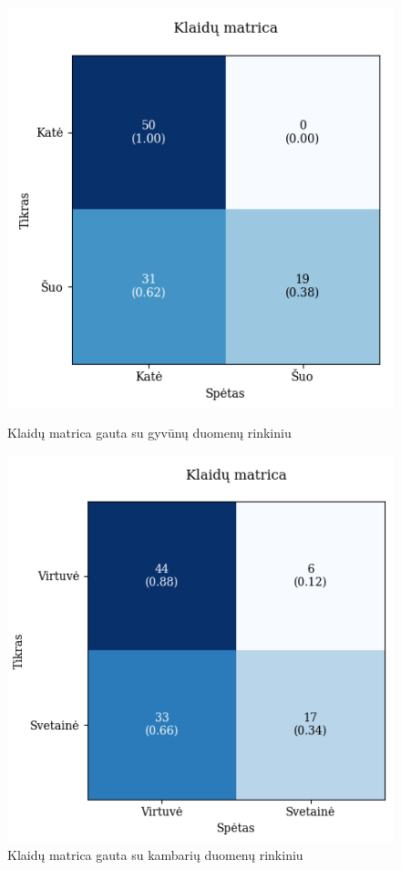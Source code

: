 \documentclass{VUMIFPSbakalaurinis}
\begin{document}
\begin{figure}[!htbp]
    \centering
    \begin{minipage}[b]{0.48\textwidth}
      \includegraphics[width=\textwidth]{img/GrapthsNEW/Small/animal/20/KM_DC_S_20.png}
      \caption{Klaidų matrica gauta su gyvūnų duomenų rinkiniu}
    \end{minipage}
    \hspace{2mm}
    \begin{minipage}[b]{0.48\textwidth}
      \includegraphics[width=\textwidth]{img/GrapthsNEW/Small/room/20/KM_R_S_20.png}
      \caption{Klaidų matrica gauta su kambarių duomenų rinkiniu}
    \end{minipage}
\end{figure}
\end{document}
